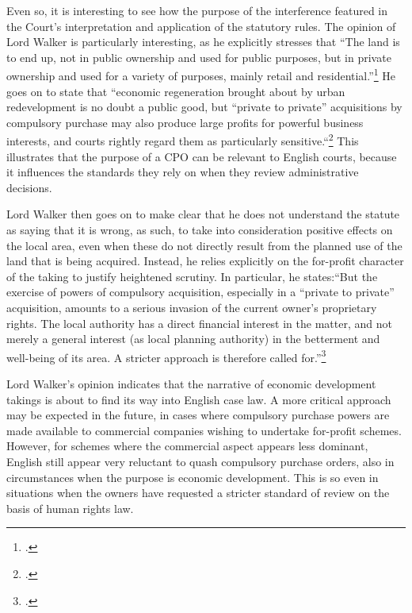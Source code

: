 Even so, it is interesting to see how the purpose of the interference featured in the Court's interpretation and application of the statutory rules. The opinion of Lord Walker is particularly interesting, as he explicitly stresses that ``The land is to end up, not in public ownership and used for public purposes, but in private ownership and used for a variety of purposes, mainly retail and residential.''\footcite[81]{sainsbury10} He goes on to state that ``economic regeneration brought about by urban redevelopment is no doubt a public good, but ``private to private'' acquisitions by compulsory purchase may also produce large profits for powerful business interests, and courts rightly regard them as particularly sensitive.``\footcite[81]{sainsbury10} This illustrates that the purpose of a CPO can be relevant to English courts, because it influences the standards they rely on when they review administrative decisions.

Lord Walker then goes on to make clear that he does not understand the statute as saying that it is wrong, as such, to take into consideration positive effects on the local area, even when these do not directly result from the planned use of the land that is being acquired. Instead, he relies explicitly on the for-profit character of the taking to justify heightened scrutiny. In particular, he states:``But the exercise of powers of compulsory acquisition, especially in a ``private to private'' acquisition, amounts to a serious invasion of the current owner's proprietary rights. The local authority has a direct financial interest in the matter, and not merely a general interest (as local planning authority) in the betterment and well-being of its area. A stricter approach is therefore called for.''\footcite[84]{sainsbury10} 

Lord Walker's opinion indicates that the narrative of economic development takings is about to find its way into English case law. A more critical approach may be expected in the future, in cases where compulsory purchase powers are made available to commercial companies wishing to undertake for-profit schemes. However, for schemes where the commercial aspect appears less dominant, English still appear very reluctant to quash compulsory purchase orders, also in circumstances when the purpose is economic development. This is so even in situations when the owners have requested a stricter standard of review on the basis of human rights law. 

